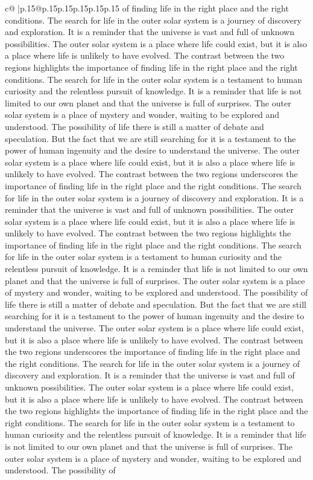 \documentclass{article}
\begin{document}
{\begin{supertabular}{c@{$\;$}|p{.15\linewidth}@{}p{.15\linewidth}p{.15\linewidth}p{.15\linewidth}p{.15\linewidth}p{.15\linewidth}}
{{{of finding life in the right place and the right conditions. The search for life in the outer solar system is a journey of discovery and exploration. It is a reminder that the universe is vast and full of unknown possibilities. The outer solar system is a place where life could exist, but it is also a place where life is unlikely to have evolved. The contrast between the two regions highlights the importance of finding life in the right place and the right conditions. The search for life in the outer solar system is a testament to human curiosity and the relentless pursuit of knowledge. It is a reminder that life is not limited to our own planet and that the universe is full of surprises. The outer solar system is a place of mystery and wonder, waiting to be explored and understood. The possibility of life there is still a matter of debate and speculation. But the fact that we are still searching for it is a testament to the power of human ingenuity and the desire to understand the universe. The outer solar system is a place where life could exist, but it is also a place where life is unlikely to have evolved. The contrast between the two regions underscores the importance of finding life in the right place and the right conditions. The search for life in the outer solar system is a journey of discovery and exploration. It is a reminder that the universe is vast and full of unknown possibilities. The outer solar system is a place where life could exist, but it is also a place where life is unlikely to have evolved. The contrast between the two regions highlights the importance of finding life in the right place and the right conditions. The search for life in the outer solar system is a testament to human curiosity and the relentless pursuit of knowledge. It is a reminder that life is not limited to our own planet and that the universe is full of surprises. The outer solar system is a place of mystery and wonder, waiting to be explored and understood. The possibility of life there is still a matter of debate and speculation. But the fact that we are still searching for it is a testament to the power of human ingenuity and the desire to understand the universe. The outer solar system is a place where life could exist, but it is also a place where life is unlikely to have evolved. The contrast between the two regions underscores the importance of finding life in the right place and the right conditions. The search for life in the outer solar system is a journey of discovery and exploration. It is a reminder that the universe is vast and full of unknown possibilities. The outer solar system is a place where life could exist, but it is also a place where life is unlikely to have evolved. The contrast between the two regions highlights the importance of finding life in the right place and the right conditions. The search for life in the outer solar system is a testament to human curiosity and the relentless pursuit of knowledge. It is a reminder that life is not limited to our own planet and that the universe is full of surprises. The outer solar system is a place of mystery and wonder, waiting to be explored and understood. The possibility of }}}
\end{supertabular}}
\end{document}
